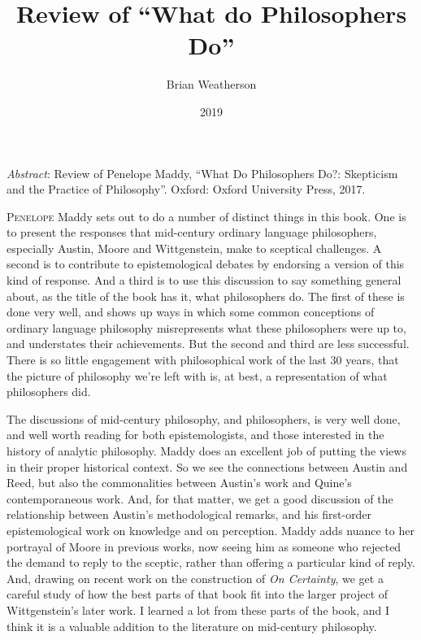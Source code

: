\documentclass[
  11pt,
  letterpaper,
  DIV=11,
  numbers=noendperiod,
  twoside]{scrartcl}
\title{Review of ``What do Philosophers Do''}
\author{Brian Weatherson}
\date{2019}
\renewenvironment{abstract}
 {\vspace{-1.25cm}
 \quotation\small\noindent\emph{Abstract}:}
 {\endquotation}
\renewenvironment{abstract}
 {\quotation\small\noindent\emph{Abstract}:}
 {\endquotation\vspace{-0.02cm}}
\begin{document}
\maketitle
\begin{abstract}
Review of Penelope Maddy, ``What Do Philosophers Do?: Skepticism and the
Practice of Philosophy''. Oxford: Oxford University Press, 2017.
\end{abstract}


\lettrine{P}{enelope} Maddy sets out to do a number of distinct things
in this book. One is to present the responses that mid-century ordinary
language philosophers, especially Austin, Moore and Wittgenstein, make
to sceptical challenges. A second is to contribute to epistemological
debates by endorsing a version of this kind of response. And a third is
to use this discussion to say something general about, as the title of
the book has it, what philosophers do. The first of these is done very
well, and shows up ways in which some common conceptions of ordinary
language philosophy misrepresents what these philosophers were up to,
and understates their achievements. But the second and third are less
successful. There is so little engagement with philosophical work of the
last 30 years, that the picture of philosophy we're left with is, at
best, a representation of what philosophers did.

The discussions of mid-century philosophy, and philosophers, is very
well done, and well worth reading for both epistemologists, and those
interested in the history of analytic philosophy. Maddy does an
excellent job of putting the views in their proper historical context.
So we see the connections between Austin and Reed, but also the
commonalities between Austin's work and Quine's contemporaneous work.
And, for that matter, we get a good discussion of the relationship
between Austin's methodological remarks, and his first-order
epistemological work on knowledge and on perception. Maddy adds nuance
to her portrayal of Moore in previous works, now seeing him as someone
who rejected the demand to reply to the sceptic, rather than offering a
particular kind of reply. And, drawing on recent work on the
construction of \emph{On Certainty}, we get a careful study of how the
best parts of that book fit into the larger project of Wittgenstein's
later work. I learned a lot from these parts of the book, and I think it
is a valuable addition to the literature on mid-century philosophy.
\end{document}
